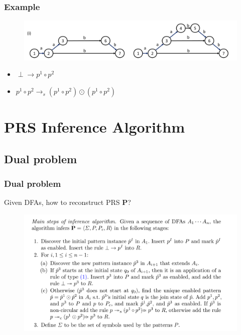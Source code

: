 \documentclass[aspectratio=169%
,serif,mathserif]{beamer}
\begin{document}
\begin{frame}
	\frametitle{Example}
	\begin{figure}
		\includegraphics[width=0.8\linewidth]{3.png}
	\end{figure}

	\begin{itemize}
		\item $\perp \rightarrow p^{1} \circ p^{2}$
		\item $p^{1} \circ p^{2} \rightarrow_{s}  (p^{1} \circ p^{2}) \odot (p^{1} \circ p^{2})$
	\end{itemize}	
\end{frame}







\section{PRS Inference Algorithm}
\subsection{Dual problem}
\begin{frame}
\frametitle{Dual problem}
Given DFAs, how to reconstruct PRS $\mathbf{P}$?
\begin{figure}
	\includegraphics[width=0.6\linewidth]{5.png}
\end{figure}

\end{frame}
\end{document}
